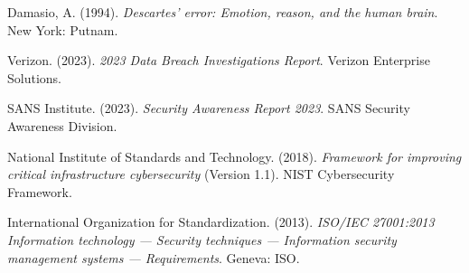 \documentclass[11pt,a4paper]{article}
\begin{document}
\begin{thebibliography}{99}
Damasio, A. (1994). \textit{Descartes' error: Emotion, reason, and the human brain}. New York: Putnam.

Verizon. (2023). \textit{2023 Data Breach Investigations Report}. Verizon Enterprise Solutions.

SANS Institute. (2023). \textit{Security Awareness Report 2023}. SANS Security Awareness Division.

National Institute of Standards and Technology. (2018). \textit{Framework for improving critical infrastructure cybersecurity} (Version 1.1). NIST Cybersecurity Framework.

International Organization for Standardization. (2013). \textit{ISO/IEC 27001:2013 Information technology — Security techniques — Information security management systems — Requirements}. Geneva: ISO.

\end{thebibliography}
\end{document}
